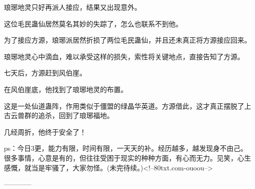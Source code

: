 \begin{this_body}
琅琊地灵只好再派人接应，结果又出现意外。

这位毛民蛊仙居然莫名其妙的失踪了，怎么也联系不到他。

为了接应方源，琅琊派居然折损了两位毛民蛊仙，并且还未真正将方源接应回来。

琅琊地灵心中滴血，难以承受这样的损失，索性将关键地点，直接告知了方源。

七天后，方源赶到风伯崖。

在风伯崖底，他找到了琅琊地灵的布置。

这是一处仙道蛊阵，作用类似于僵盟的绿晶华英道。方源借此，这才真正摆脱了上古云兽群的追杀，回到了琅琊福地。

几经周折，他终于安全了！

ps：今日3更，能力有限，时间有限，一天天的补。经历越多，越发现身不由己。很多事情，心意是有的，但往往受困于现实的种种方面，有心而无力。见笑，心生感慨，就当是牢骚了，大家勿怪。(未完待续。)<!--80txt.com-ouoou-->

------------

\end{this_body}

